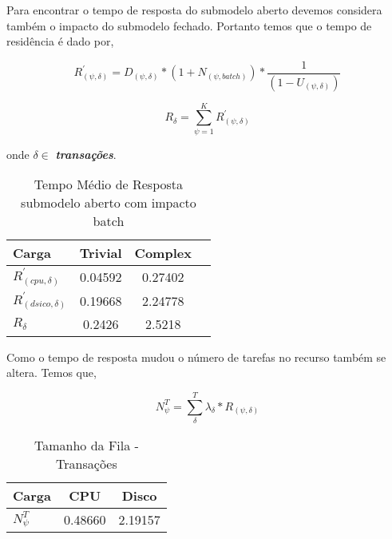 \documentclass[11pt,a4paper]{abntex2}
\begin{document}
Para encontrar o tempo de resposta do submodelo aberto devemos considera também o impacto do submodelo fechado.
Portanto temos que o tempo de residência é dado por,

\begin{equation}
R^{'}_{(\psi,\delta)} = D_{(\psi,\delta)}*(1 + N_{(\psi,batch)})*\frac{1}{(1 - U_{(\psi,\delta)})}
\end{equation} 

\begin{equation}
R_{\delta} = \sum_{\psi =1}^{K} R^{'}_{(\psi,\delta)} 
\end{equation} 

onde $\delta \in$ \textit{\textbf{transações}}.



\begin{table}[htbp]
	\centering
	\caption{Tempo Médio de Resposta submodelo aberto com impacto batch} 
	\begin{tabular}{lccc}
		\toprule
		Carga                    & Trivial  & Complex \\
		\midrule
		$R^{'}_{(cpu,\delta)}$   &  0.04592 & 0.27402 \\[3pt]
		$R^{'}_{(dsico,\delta)}$ &  0.19668 & 2.24778\\[3pt]
		$R_{\delta}$             &  0.2426  & 2.5218 \\[3pt]
		\bottomrule
	\end{tabular}%
	\label{tab:TMR_t}%
\end{table}%

Como o tempo de resposta mudou o número de tarefas no recurso também se altera. Temos que,

\begin{equation}
N^{T}_{\psi} = \sum_{\delta}^{T} \lambda_{\delta}*R_{(\psi,\delta)}
\end{equation}


\begin{table}[htbp]
	\centering
	\caption{Tamanho da Fila -  Transações} 
	\begin{tabular}{lcc}
		\toprule
		Carga          & CPU    & Disco \\
		\midrule
		$N^{T}_{\psi}$ & 0.48660 & 2.19157\\[3pt]
		\bottomrule
	\end{tabular}%
	\label{tab:addlabel}%
\end{table}%
\end{document}
